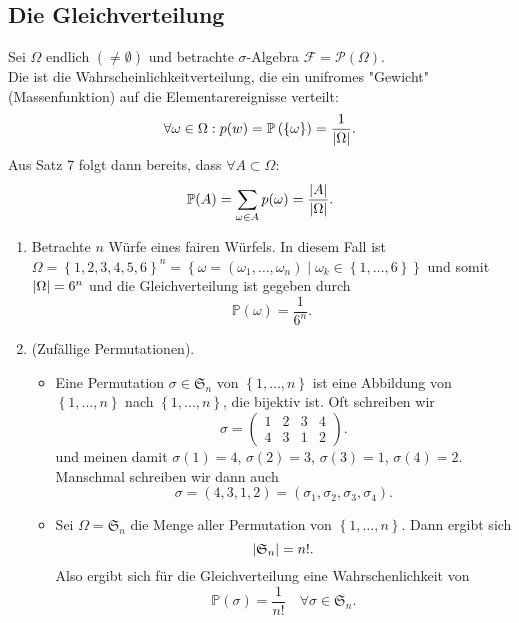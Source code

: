 \subsection{Die Gleichverteilung}
Sei $\Omega$ endlich $(\neq \emptyset)$ und betrachte $\sigma$-Algebra $\mathcal{F} = \mathcal{P}(\Omega)$. \\
Die  ist die Wahrscheinlichkeitverteilung, die ein unifromes "Gewicht" (Massenfunktion) auf die Elementarereignisse verteilt:
\[
    \forall \omega\in \Omega : p(w) = \mathbb{P}\left( \left \{\omega\right\}  \right) = \frac{1}{\lvert\Omega\rvert }
.\] 
Aus Satz 7 folgt dann bereits, dass $\forall A\subset \Omega\colon$
\[
    \mathbb{P}(A) = \sum_{\omega\in A} p(\omega) = \frac{\lvert A\rvert }{\lvert\Omega\rvert }
.\] 
\begin{example}
    \begin{enumerate}[label=\protect\circled{\alph*}]
        \item Betrachte $n$ Würfe eines fairen Würfels. In diesem Fall ist  $\Omega = \left \{1,2,3,4,5,6\right\} ^n = \left \{\omega = (\omega_1,\ldots,\omega_n) \mid  \omega_k \in \left \{1,\ldots,6\right\} \right\} $ und somit $\lvert\Omega\rvert=6^n$ und die Gleichverteilung ist gegeben durch
            \[
                \mathbb{P}(\omega) = \frac{1}{6^n}
            .\] 
        \item (Zufällige Permutationen). 
            \begin{itemize}
                \item Eine Permutation $\sigma \in \mathfrak{S}_n$ von $\left \{1,\ldots,n\right\} $ ist eine Abbildung von $\left \{1,\ldots,n\right\} $ nach $\left \{1,\ldots,n\right\} $, die bijektiv ist. Oft schreiben wir 
                     \[
                         \sigma = \begin{pmatrix} 1 & 2 & 3 & 4 \\ 4 & 3 & 1 & 2 \end{pmatrix} 
                    .\] 
                    und meinen damit $\sigma(1) = 4$,  $\sigma(2) = 3$,  $\sigma(3) = 1$,  $\sigma(4)=2$. Manschmal schreiben wir dann auch
                     \[
                         \sigma = (4,3,1,2) = (\sigma_1, \sigma_2, \sigma_3,\sigma_4)
                    .\] 
                \item Sei $\Omega = \mathfrak{S}_n$ die Menge aller Permutation von $\left \{1,\ldots,n\right\} $. Dann ergibt sich
                    \[
                    \lvert\mathfrak{S}_n\rvert =n!
                    .\] 
                    Also ergibt sich für die Gleichverteilung eine Wahrschenlichkeit von
                    \[
                        \mathbb{P}(\sigma) = \frac{1}{n!} \quad \forall \sigma \in \mathfrak{S}_n
                    .\] 
            \end{itemize}
    \end{enumerate}
\end{example}
